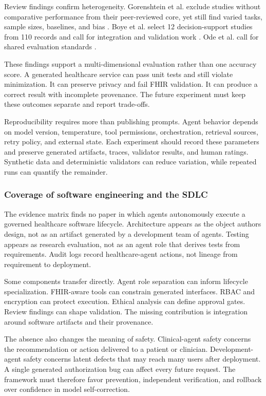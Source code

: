 \documentclass[11pt,a4paper]{article}
\begin{document}
Review findings confirm heterogeneity. Gorenshtein et al. exclude studies without comparative performance from their peer-reviewed core, yet still find varied tasks, sample sizes, baselines, and bias \cite[pp.~6--13]{gorenshtein2025clinical}. Boye et al. select 12 decision-support studies from 110 records and call for integration and validation work \cite[pp.~1--9]{boye2025decision}. Ode et al. call for shared evaluation standards \cite[p.~8]{ode2025evidence}.

These findings support a multi-dimensional evaluation rather than one accuracy score. A generated healthcare service can pass unit tests and still violate minimization. It can preserve privacy and fail FHIR validation. It can produce a correct result with incomplete provenance. The future experiment must keep these outcomes separate and report trade-offs.

Reproducibility requires more than publishing prompts. Agent behavior depends on model version, temperature, tool permissions, orchestration, retrieval sources, retry policy, and external state. Each experiment should record these parameters and preserve generated artifacts, traces, validator results, and human ratings. Synthetic data and deterministic validators can reduce variation, while repeated runs can quantify the remainder.

\subsubsection{Coverage of software engineering and the SDLC}

The evidence matrix finds no paper in which agents autonomously execute a governed healthcare software lifecycle. Architecture appears as the object authors design, not as an artifact generated by a development team of agents. Testing appears as research evaluation, not as an agent role that derives tests from requirements. Audit logs record healthcare-agent actions, not lineage from requirement to deployment.

Some components transfer directly. Agent role separation can inform lifecycle specialization. FHIR-aware tools can constrain generated interfaces. RBAC and encryption can protect execution. Ethical analysis can define approval gates. Review findings can shape validation. The missing contribution is integration around software artifacts and their provenance.

The absence also changes the meaning of safety. Clinical-agent safety concerns the recommendation or action delivered to a patient or clinician. Development-agent safety concerns latent defects that may reach many users after deployment. A single generated authorization bug can affect every future request. The framework must therefore favor prevention, independent verification, and rollback over confidence in model self-correction.
\end{document}
